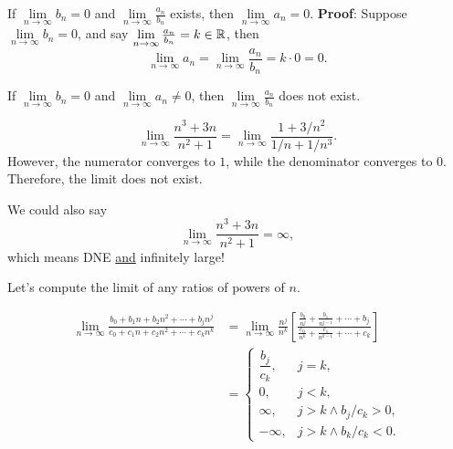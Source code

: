 \begin{Theorem}{}{}
    If $ \lim\limits_{{n} \to {\infty}}b_n=0 $
    and $ \lim\limits_{{n} \to {\infty}}\frac{a_n}{b_n} $
    exists, then $ \lim\limits_{{n} \to {\infty}}a_n=0 $.
    \tcblower{}
    \textbf{Proof}: Suppose $ \lim\limits_{{n} \to {\infty}}b_n=0 $,
    and say $ \lim\limits_{{n} \to {\infty}}\frac{a_n}{b_n}=k\in\mathbb{R} $,
    then
    \[ \lim\limits_{{n} \to {\infty}}a_n=
        \lim\limits_{{n} \to {\infty}}\frac{a_n}{b_n}=
        k\cdot 0=0. \]
\end{Theorem}
\begin{Corollary}{}{}
    If $ \lim\limits_{{n} \to {\infty}}b_n=0 $
    and $ \lim\limits_{{n} \to {\infty}}a_n\ne 0 $,
    then $ \lim\limits_{{n} \to {\infty}}\frac{a_n}{b_n} $
    does not exist.
\end{Corollary}
\begin{Example}{}{}
    \[ \lim\limits_{{n} \to {\infty}}\frac{n^3+3n}{n^2+1}=
        \lim\limits_{{n} \to {\infty}}\frac{1+3/n^2}{1/n+1/n^3}. \]
    However, the numerator converges to $ 1 $,
    while the denominator converges to $ 0 $.
    Therefore, the limit does not exist.

    We could also say
    \[ \lim\limits_{{n} \to {\infty}}\frac{n^3+3n}{n^2+1}=\infty, \]
    which means DNE \underline{and} infinitely large!
\end{Example}
Let's compute the limit of any ratios of powers of $ n $.
\begin{Proposition}{}{}
    \begin{align*}
        \lim\limits_{{n} \to {\infty}}\frac{b_0+b_1n+b_2n^2+\cdots+b_j n^j}{c_0+c_1n+c_2n^2+\cdots+c_k n^k}
         & =\lim\limits_{{n} \to {\infty}}\frac{n^j}{n^k}
        \left[\frac{\displaystyle \frac{b_0}{n^j}+\frac{b_1}{n^{j-1}}+\cdots+b_j}{
                \displaystyle \frac{c_0}{n^k}+\frac{c_1}{n^{k-1}}+\cdots+c_k
        }\right]                                          \\
         & =\begin{cases}
                \dfrac{b_j}{c_k}, & j=k,                \\
                0,                & j<k,                \\
                \infty,           & j>k\land b_j/c_k>0, \\
                -\infty,          & j>k\land b_k/c_k<0.
            \end{cases}
    \end{align*}
\end{Proposition}
